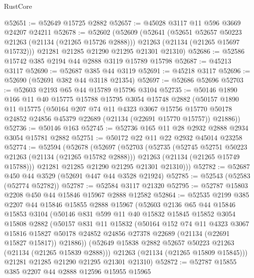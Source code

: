 \begin{lexlean}{RustCore}
\begin{coremodule}
@52651 := @52649 @15725 @2882
@52657 := @45028 @3117 @11 @596 @3669 @24207 @24211
@52678 := @52602
    (@52609
      (@52641
        (@52651 @52657 @50223 @21263 (@21134 (@21265 @15726 @2888)))
        @21263
        (@21134 (@21265 @15697 @15732)))
      @21281
      @21285
      @21290
      @21295
      @21301
      @21310)
@52686 := @52586 @15742 @385 @2194 @44 @2888 @3119 @15789 @15798
@52687 := @45213 @3117
@52690 := @52687 @385 @44 @3119
@52691 := @45218 @3117
@52696 := @52690 (@52691 @382 @44 @3118 @21354)
@52697 := @52686 @52696
@52703 := @52603 @2193 @65 @44 @15789 @15796 @3104
@52735 := @50146
    @1890
    @166
    @11
    @40
    @15775
    @15788
    @15795
    @3054
    @15748
    @2882
    (@50157
      @1890
      @11
      @15775
      (@50164
        @207
        @74
        @11
        @4323
        @3067
        @15756
        @15770
        @50178
        @24852
        @24856
        @45379
        @22689
        (@21134 (@22691 @15770 @15757))
        @21886))
@52736 := @50146 @163
@52745 := @52736 @165 @11 @28 @2932 @2888 @2934 @3054 @15781 @2882
@52751 := @50172 @22 @11 @22 @2932 @45014 @23258
@52774 := @52594
    (@52678
      (@52697
        (@52703
          (@52735
            (@52745 @52751 @50223 @21263 (@21134 (@21265 @15782 @2888)))
            @21263
            (@21134 (@21265 @15749 @15788)))
          @21281
          @21285
          @21290
          @21295
          @21301
          @21310)))
@52782 := @52687 @450 @44 @3529 (@52691 @447 @44 @3528 @21924)
@52785 := @52543 (@52583 (@52774 @52782))
@52787 := @52584 @3117 @21320
@52795 := @52787 @15803 @2208 @450 @44 @15846 @15967 @2888 @12582
@52864 := @52535
    @2199
    @385
    @2207
    @44
    @15846
    @15855
    @2888
    @15967
    (@52603
      @2136
      @65
      @44
      @15846
      @15853
      @3104
      (@50146
        @831
        @599
        @11
        @40
        @15832
        @15845
        @15852
        @3054
        @15808
        @2882
        (@50157
          @831
          @11
          @15832
          (@50164
            @152
            @74
            @11
            @4323
            @3067
            @15816
            @15827
            @50178
            @24852
            @24856
            @27378
            @22689
            (@21134 (@22691 @15827 @15817))
            @21886))
        (@52649 @15838 @2882 @52657 @50223 @21263 (@21134 (@21265 @15839 @2888)))
        @21263
        (@21134 (@21265 @15809 @15845)))
      @21281
      @21285
      @21290
      @21295
      @21301
      @21310)
@52872 := @52787 @15855 @385 @2207 @44 @2888 @12596 @15955 @15965

\end{coremodule}
\end{lexlean}
